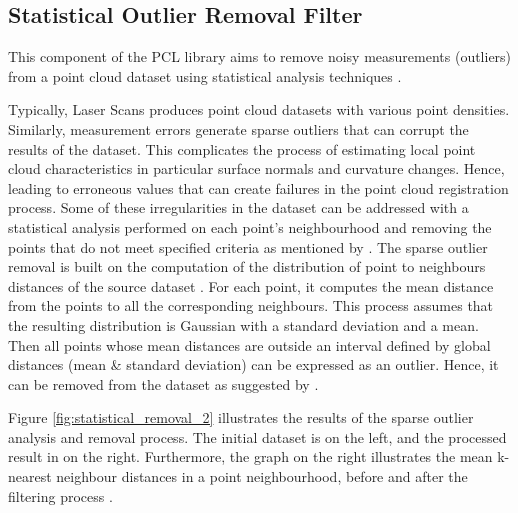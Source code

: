 \documentclass[12pt]{report}
\begin{document}


\subsection{Statistical Outlier Removal Filter}
\label{section:StatisticalOutlierRemovalFilter}

This component of the PCL library aims to remove noisy measurements (outliers) from a point cloud dataset using statistical analysis techniques .

Typically, Laser Scans produces point cloud datasets with various point densities. Similarly, measurement errors generate sparse outliers that can corrupt the results of the dataset.
This complicates the process of estimating local point cloud characteristics in particular surface normals and curvature changes. Hence, leading to erroneous values that can create failures in the point cloud registration process.
Some of these irregularities in the dataset can be addressed with a statistical analysis performed on each point's neighbourhood and removing the points that do not meet specified criteria as mentioned by .
The sparse outlier removal is built on the computation of the distribution of point to neighbours distances of the source dataset .
For each point, it computes the mean distance from the points to all the corresponding neighbours. This process assumes that the resulting distribution is Gaussian with a standard deviation and a mean.
Then all points whose mean distances are outside an interval defined by global distances (mean \& standard deviation) can be expressed as an outlier. Hence, it can be removed from the dataset as suggested by .

Figure \ref{fig:statistical_removal_2} illustrates the results of the sparse outlier analysis and removal process.
The initial dataset is on the left, and the processed result in on the right. Furthermore, the graph on the right illustrates the mean k-nearest neighbour distances in a point 
neighbourhood, before and after the filtering process \cite[]{Rusu_ICRA2011_PCL}.
\end{document}
